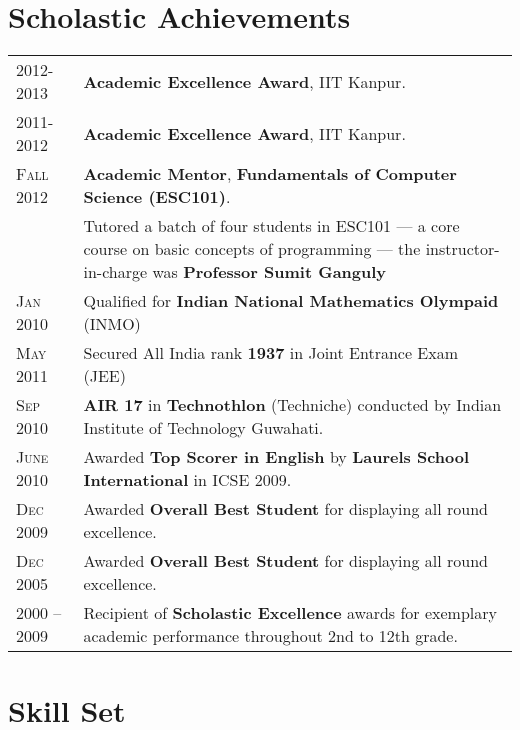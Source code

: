 \documentclass[a4paper,10pt]{article} %
\begin{document}
\section{Scholastic Achievements}

\begin{tabular}{>{\raggedleft}p{2.2cm}p{15cm}}

    \textsc{2012-2013}   & \textbf{Academic Excellence Award}, IIT Kanpur. \\
    \textsc{2011-2012}   & \textbf{Academic Excellence Award}, IIT Kanpur. \\
    \textsc{Fall 2012}   & \textbf{Academic Mentor}, \textbf{Fundamentals of Computer Science (ESC101)}. \\
                         & \footnotesize{Tutored a batch of four students in ESC101 --- a core course on
                            basic concepts of programming --- the instructor-in-charge was \textbf{Professor
                            Sumit Ganguly}}\\
    \textsc{Jan 2010}    & Qualified for \textbf{Indian National Mathematics Olympaid} (INMO) \\
    \textsc{May 2011}    & Secured All India rank \textbf{1937} in Joint Entrance Exam (JEE) \\
    \textsc{Sep 2010}    & \textbf{AIR 17} in \textbf{Technothlon} (Techniche) conducted by Indian Institute of Technology Guwahati. \\
    \textsc{June 2010}   & Awarded \textbf{Top Scorer in English} by \textbf{Laurels School International} in ICSE 2009. \\
    \textsc{Dec 2009}    & Awarded \textbf{Overall Best Student} for displaying all round excellence. \\
    \textsc{Dec 2005}    & Awarded \textbf{Overall Best Student} for displaying all round excellence. \\
    \textsc{2000 -- 2009} & Recipient of \textbf{Scholastic Excellence} awards for exemplary academic
                           performance throughout 2nd to 12th grade. \\

\end{tabular}

\section{Skill Set}
\end{document}
